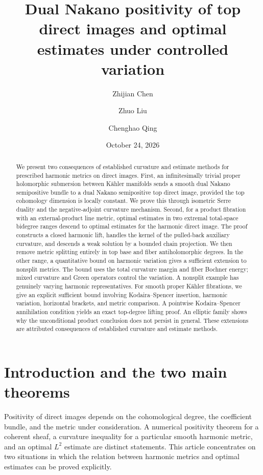 \documentclass[11pt,reqno]{amsart}
\title[Two results on harmonic direct images]{Dual Nakano positivity of top direct images and optimal estimates under controlled variation}
\author{Zhijian Chen}
\author{Zhuo Liu}
\author{Chenghao Qing}
\date{October 24, 2026}
\numberwithin{equation}{section}
\theoremstyle{definition}
\theoremstyle{remark}
\begin{document}
\begin{abstract}
We present two consequences of established curvature and estimate methods for prescribed harmonic metrics on direct images. First, an infinitesimally trivial proper holomorphic submersion between K\"ahler manifolds sends a smooth dual Nakano semipositive bundle to a dual Nakano semipositive top direct image, provided the top cohomology dimension is locally constant. We prove this through isometric Serre duality and the negative-adjoint curvature mechanism. Second, for a product fibration with an external-product line metric, optimal estimates in two extremal total-space bidegree ranges descend to optimal estimates for the harmonic direct image. The proof constructs a closed harmonic lift, handles the kernel of the pulled-back auxiliary curvature, and descends a weak solution by a bounded chain projection. We then remove metric splitting entirely in top base and fiber antiholomorphic degrees. In the other range, a quantitative bound on harmonic variation gives a sufficient extension to nonsplit metrics. The bound uses the total curvature margin and fiber Bochner energy; mixed curvature and Green operators control the variation. A nonsplit example has genuinely varying harmonic representatives. For smooth proper K\"ahler fibrations, we give an explicit sufficient bound involving Kodaira--Spencer insertion, harmonic variation, horizontal brackets, and metric comparison. A pointwise Kodaira--Spencer annihilation condition yields an exact top-degree lifting proof. An elliptic family shows why the unconditional product conclusion does not persist in general. These extensions are attributed consequences of established curvature and estimate methods.
\end{abstract}
\maketitle
\tableofcontents

\section{Introduction and the two main theorems}\label{sec:introduction}

Positivity of direct images depends on the cohomological degree, the coefficient bundle, and the metric under consideration. A numerical positivity theorem for a coherent sheaf, a curvature inequality for a particular smooth harmonic metric, and an optimal $L^2$ estimate are distinct statements. This article concentrates on two situations in which the relation between harmonic metrics and optimal estimates can be proved explicitly.
\end{document}
